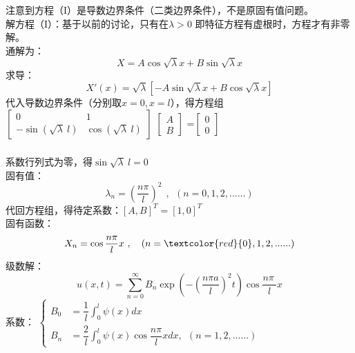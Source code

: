 \begin{frame}
	\frametitle{}
	注意到方程（I）是导数边界条件（二类边界条件），不是原固有值问题。\\ \vspace{0.3em}
	{\Bullet}解方程（I）：基于以前的讨论，只有在$\lambda >0 $ 即特征方程有虚根时，方程才有非零解。\\
	通解为：
	\begin{equation*}
		X=A\cos \sqrt{\lambda} x + B \sin \sqrt{\lambda} x
	\end{equation*}
	求导：
	\begin{equation*}
		X' (x)=\sqrt{\lambda} [-A\sin \sqrt{\lambda} x + B \cos \sqrt{\lambda} x]
	\end{equation*}
	代入导数边界条件（分别取$x=0, x=l$），得方程组 \\ \vspace{0.3em}
	$\left[
	\begin{array}{lll}
		0&1\\
		-\sin( {\sqrt{\lambda}~l}) &\cos ({\sqrt{\lambda}~l})
	\end{array}
	\right]$
	$\left[
	\begin{array}{ll}
		A\\
		B
	\end{array}
	\right]$
	=$\left[
	\begin{array}{ll}
		0\\
		0
	\end{array}
	\right]$\\ 	
\end{frame}	

\begin{frame}
	\frametitle{}
	系数行列式为零，得$ \sin\sqrt{\lambda}~l =0$\\
	固有值：
	\begin{equation*}
		\lambda_n =(\frac{n\pi}{l})^2 ~~,~~ (n=0,1,2,......)
	\end{equation*}
	代回方程组，得待定系数：$ [A, B] ^T =[1, 0] ^T$\\
	固有函数：
	\begin{equation*}
		X_n=\cos \frac{n\pi}{l} x~,~~~  (n=\textcolor{red}{0},1,2,......)
	\end{equation*}
	级数解：
	\begin{equation*}
		u(x,t)=\sum\limits_{n=0}^{\infty } B_n  \exp(-(\frac{n\pi a}{l})^2 t) \cos \frac{n\pi~}{l} x
	\end{equation*}
	系数：
	$\displaystyle  \begin{cases}
		B_0&= \dfrac{1}{l} \int_{0}^{l} \psi(x) dx \\
		B_n&= \dfrac{2}{l} \int_{0}^{l} \psi(x) \cos \dfrac{n\pi}{l} xdx ,~~ (n=1,2,......)
	\end{cases}$ \\	
\end{frame}	

